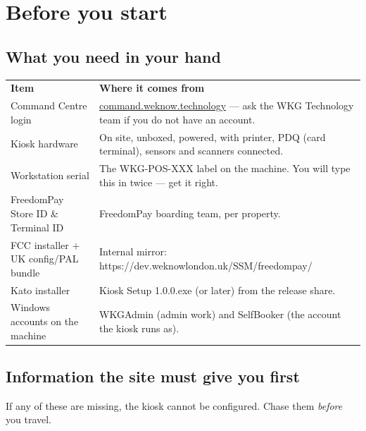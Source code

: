 \documentclass[a4paper,10pt]{article}
\newcommand{\wpath}[1]{{\ttfamily\small #1}}
\begin{document}
\tableofcontents
\clearpage

\section{Before you start}

\subsection{What you need in your hand}

\begin{center}
\renewcommand{\arraystretch}{1.35}\small
\begin{tabularx}{\textwidth}{L{44mm} X}
\color{white}\textbf{Item} &
\color{white}\textbf{Where it comes from}\\
Command Centre login &
\href{https://command.weknow.technology}{command.weknow.technology} --- ask
the WKG Technology team if you do not have an account.\\
Kiosk hardware &
On site, unboxed, powered, with printer, PDQ (card terminal), sensors and
scanners connected.\\
Workstation serial &
The \wpath{WKG-POS-XXX} label on the machine. You will type this in twice
--- get it right.\\
FreedomPay Store ID \& Terminal ID &
FreedomPay boarding team, per property.\\
FCC installer + UK config/PAL bundle &
Internal mirror: \wpath{https://dev.weknowlondon.uk/SSM/freedompay/}\\
Kato installer &
\wpath{Kiosk Setup 1.0.0.exe} (or later) from the release share.\\
Windows accounts on the machine &
\wpath{WKGAdmin} (admin work) and \wpath{SelfBooker} (the account the
kiosk runs as).\\
\end{tabularx}
\end{center}

\subsection{Information the site must give you first}

If any of these are missing, the kiosk cannot be configured. Chase them
\emph{before} you travel.
\end{document}
